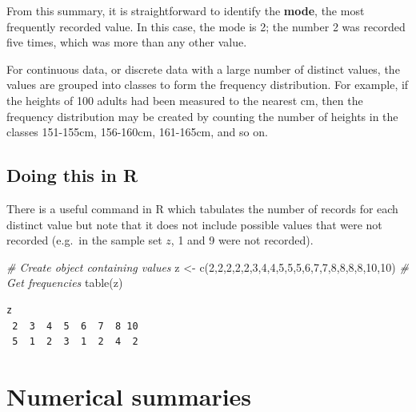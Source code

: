 \documentclass[
  oneside]{krantz}
\newenvironment{Shaded}{\begin{snugshade}}{\end{snugshade}}
\newcommand{\CommentTok}[1]{\textcolor[rgb]{0.56,0.35,0.01}{\textit{#1}}}
\newcommand{\DecValTok}[1]{\textcolor[rgb]{0.00,0.00,0.81}{#1}}
\newcommand{\FunctionTok}[1]{\textcolor[rgb]{0.00,0.00,0.00}{#1}}
\newcommand{\NormalTok}[1]{#1}
\newcommand{\OtherTok}[1]{\textcolor[rgb]{0.56,0.35,0.01}{#1}}
\begin{document}
From this summary, it is straightforward to identify the \textbf{mode}, the most frequently recorded value. In this case, the mode is 2; the number 2 was recorded five times, which was more than any other value.

For continuous data, or discrete data with a large number of distinct values, the values are grouped into classes to form the frequency distribution. For example, if the heights of 100 adults had been measured to the nearest cm, then the frequency distribution may be created by counting the number of heights in the classes 151-155cm, 156-160cm, 161-165cm, and so on.

\hypertarget{doing-this-in-r-2}{%
\subsection{Doing this in R}\label{doing-this-in-r-2}}

There is a useful command in R which tabulates the number of records for each distinct value but note that it does not include possible values that were not recorded (e.g.~in the sample set \(z\), 1 and 9 were not recorded).

\begin{Shaded}
\begin{Highlighting}[]
\CommentTok{\# Create object containing values}
\NormalTok{z }\OtherTok{\textless{}{-}} \FunctionTok{c}\NormalTok{(}\DecValTok{2}\NormalTok{,}\DecValTok{2}\NormalTok{,}\DecValTok{2}\NormalTok{,}\DecValTok{2}\NormalTok{,}\DecValTok{2}\NormalTok{,}\DecValTok{3}\NormalTok{,}\DecValTok{4}\NormalTok{,}\DecValTok{4}\NormalTok{,}\DecValTok{5}\NormalTok{,}\DecValTok{5}\NormalTok{,}\DecValTok{5}\NormalTok{,}\DecValTok{6}\NormalTok{,}\DecValTok{7}\NormalTok{,}\DecValTok{7}\NormalTok{,}\DecValTok{8}\NormalTok{,}\DecValTok{8}\NormalTok{,}\DecValTok{8}\NormalTok{,}\DecValTok{8}\NormalTok{,}\DecValTok{10}\NormalTok{,}\DecValTok{10}\NormalTok{)}
\CommentTok{\# Get frequencies}
\FunctionTok{table}\NormalTok{(z)}
\end{Highlighting}
\end{Shaded}

\begin{verbatim}
z
 2  3  4  5  6  7  8 10 
 5  1  2  3  1  2  4  2 
\end{verbatim}

\hypertarget{numerical-summaries}{%
\section{Numerical summaries}\label{numerical-summaries}}
\end{document}
